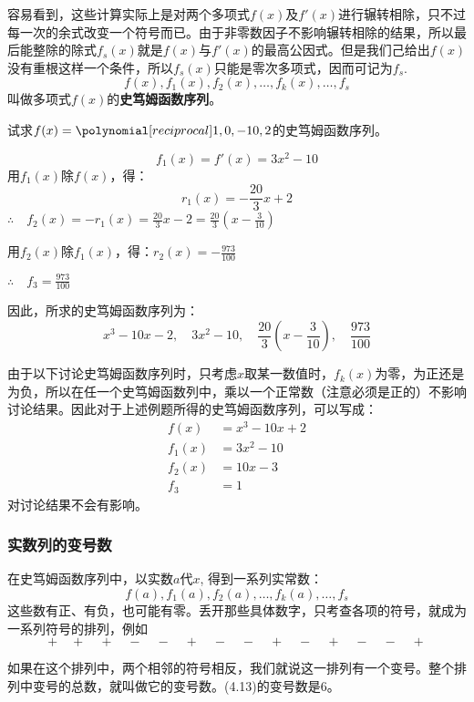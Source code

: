 容易看到，这些计算实际上是对两个多项式$f(x)$及$f'(x)$进行辗转相除，只不过每一次的余式改变一个符号而已。由于非零数因子不影响辗转相除的结果，所以最后能整除的除式$f_s(x)$就是$f(x)$与$f'(x)$的最高公因式。但是我们己给出$f(x)$没有重根这样一个条件，所以$f_s(x)$只能是零次多项式，因而可记为$f_s$.
\[f (x) ,f_1 (x) ,f_2 (x),\ldots,f_k(x),\ldots,f_s\]
叫做多项式$f(x)$的\textbf{史笃姆函数序列}。


\begin{example}
    试求$f(x)=\poly{1,0,-10,2}$的史笃姆函数序列。
\end{example}

\begin{solution}
\[f_1(x)=f'(x)=3x^2-10\]
用$f_1(x)$除$f(x)$，得：
\[r_1(x)=-\frac{20}{3}x+2\]
$\therefore\quad f_2(x)=-r_1(x)=\frac{20}{3}x-2=\frac{20}{3}\left(x-\frac{3}{10}\right)$

用$f_2(x)$除$f_1(x)$，得：$r_2(x)=-\frac{973}{100}$

$\therefore\quad f_3=\frac{973}{100}$    

因此，所求的史笃姆函数序列为：
\[x^3-10x-2,\quad 3x^2-10,\quad \frac{20}{3}\left(x-\frac{3}{10}\right),\quad \frac{973}{100}\]
\end{solution}

由于以下讨论史笃姆函数序列时，只考虑$x$取某一数值时，$f_k(x)$为零，为正还是为负，所以在任一个史笃姆函数列中，乘以一个正常数（注意必须是正的）不影响讨论结果。因此对于上述例题所得的史笃姆函数序列，可以写成：
\[\begin{split}
    f (x) &=x^3-10x+2\\
    f_1 (x) &=3x^2-10\\
    f_2 (x) &=10x-3\\
    f_3&=1
\end{split}\]
对讨论结果不会有影响。

\subsubsection{实数列的变号数}

在史笃姆函数序列中，以实数$a$代$x$, 得到一系列实常数：$$f(a),f_1(a),f_2(a),\ldots,f_k(a),\ldots, f_s$$ 这些数有正、有负，也可能有零。丢开那些具体数字，只考查各项的符号，就成为一系列符号的排列，例如
\begin{equation}
    +\quad +\quad +\quad -\quad -\quad +\quad -\quad -\quad +\quad -\quad +\quad -\quad -\quad +
\end{equation}

如果在这个排列中，两个相邻的符号相反，我们就说这一排列有一个变号。整个排列中变号的总数，就叫做它的变号数。(4.13)的变号数是6。

